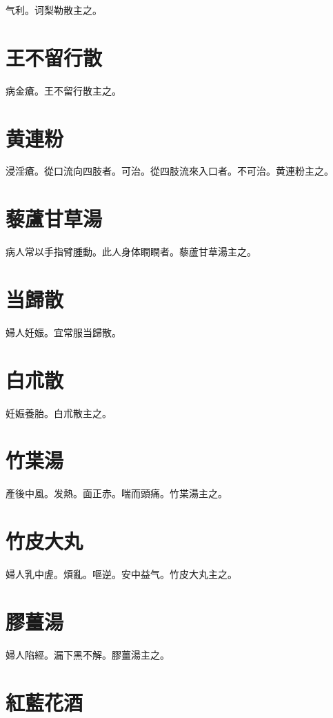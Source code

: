 \documentclass[b5paper,twoside,zihao=-4,UTF8]{ctexbook}
\begin{document}
气利。诃梨勒散主之。

\section{王不留行散}

病金瘡。王不留行散主之。

\section{黄連粉}

浸淫瘡。從口流向四肢者。可治。從四肢流來入口者。不可治。黄連粉主之。

\section{藜蘆甘草湯}

病人常以手指臂腫動。此人身体瞤瞤者。藜蘆甘草湯主之。

\section{当歸散}

婦人妊娠。宜常服当歸散。

\section{白朮散}

妊娠養胎。白朮散主之。

\section{竹枼湯}

產後中風。发熱。面{正}赤。喘而頭痛。竹枼湯主之。

\section{竹皮大丸}

婦人乳中虗。煩亂。嘔逆。安中益气。竹皮大丸主之。

\section{膠薑湯}

婦人陷經。漏下黑不解。膠薑湯主之。

\section{紅藍花酒}
\end{document}
